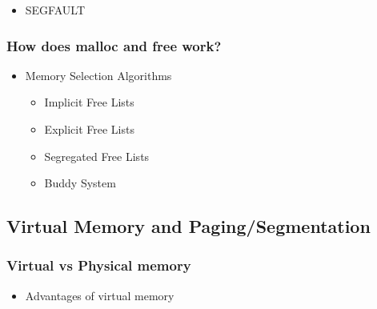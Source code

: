 \documentclass[11pt]{article}
\begin{document}
\begin{itemize}

\item SEGFAULT\\
\label{sec-5.4.1.1}

\end{itemize} %
\subsubsection{How does malloc and free work?}
\label{sec-5.4.2}

\begin{itemize}

\item Memory Selection Algorithms\\
\label{sec-5.4.2.1}

\begin{itemize}

\item Implicit Free Lists\\
\label{sec-5.4.2.1.1}


\item Explicit Free Lists\\
\label{sec-5.4.2.1.2}


\item Segregated Free Lists\\
\label{sec-5.4.2.1.3}


\item Buddy System\\
\label{sec-5.4.2.1.4}

\end{itemize} %
\end{itemize} %
\subsection{Virtual Memory and Paging/Segmentation}
\label{sec-5.5}

\subsubsection{Virtual vs Physical memory}
\label{sec-5.5.1}

\begin{itemize}

\item Advantages of virtual memory\\
\label{sec-5.5.1.1}

\end{itemize} %
\end{document}
